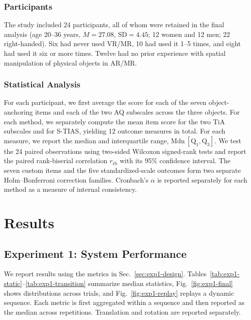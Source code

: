 \documentclass[review]{vgtc}
\begin{document}
\subsubsection{Participants}

The study included 24 participants, all of whom were retained in the final analysis (age 20--36 years, $M=27.08$, $\mathrm{SD}=4.45$; 12 women and 12 men; 22 right-handed). Six had never used VR/MR, 10 had used it 1--5 times, and eight had used it six or more times. Twelve had no prior experience with spatial manipulation of physical objects in AR/MR.

\subsubsection{Statistical Analysis}

For each participant, we first average the score for each of the seven object-anchoring items and each of the two AQ subscales across the three objects. For each method, we separately compute the mean item score for the two TiA subscales and for S-TIAS, yielding 12 outcome measures in total. For each measure, we report the median and interquartile range, $\mathrm{Mdn}\ [\mathrm{Q}_1, \mathrm{Q}_3]$. We test the 24 paired observations using two-sided Wilcoxon signed-rank tests and report the paired rank-biserial correlation $r_{\mathrm{rb}}$ with its 95\% confidence interval. The seven custom items and the five standardized-scale outcomes form two separate Holm--Bonferroni correction families. Cronbach's $\alpha$ is reported separately for each method as a measure of internal consistency.

\section{Results}\label{sec:results}

\subsection{Experiment 1: System Performance}

We report results using the metrics in Sec.~\ref{sec:exp1-design}. Tables~\ref{tab:exp1-static}--\ref{tab:exp1-transition} summarize median statistics, Fig.~\ref{fig:exp1-final} shows distributions across trials, and Fig.~\ref{fig:exp1-replay} replays a dynamic sequence. Each metric is first aggregated within a sequence and then reported as the median across repetitions. Translation and rotation are reported separately.
\end{document}

